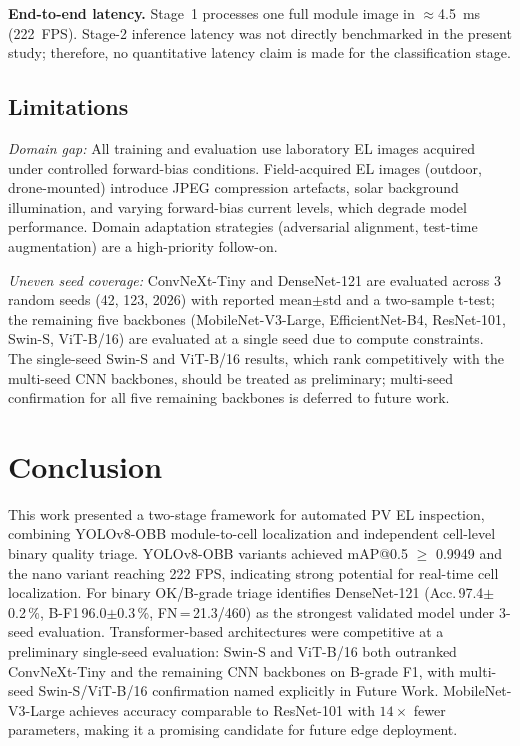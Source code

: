 \documentclass[conference]{IEEEtran}
\begin{document}
\textbf{End-to-end latency.} Stage~1 processes one full module image in $\approx$4.5~ms (222~FPS). Stage-2 inference latency was not directly benchmarked in the present study; therefore, no quantitative latency claim is made for the classification stage.

\subsection{Limitations}

\textit{Domain gap:} All training and evaluation use laboratory EL images acquired under controlled forward-bias conditions. Field-acquired EL images (outdoor, drone-mounted) introduce JPEG compression artefacts, solar background illumination, and varying forward-bias current levels, which degrade model performance. Domain adaptation strategies (adversarial alignment, test-time augmentation) are a high-priority follow-on.

\textit{Uneven seed coverage:} ConvNeXt-Tiny and DenseNet-121 are evaluated across 3 random seeds (42, 123, 2026) with reported mean$\pm$std and a two-sample t-test; the remaining five backbones (MobileNet-V3-Large, EfficientNet-B4, ResNet-101, Swin-S, ViT-B/16) are evaluated at a single seed due to compute constraints. The single-seed Swin-S and ViT-B/16 results, which rank competitively with the multi-seed CNN backbones, should be treated as preliminary; multi-seed confirmation for all five remaining backbones is deferred to future work.

\section{Conclusion}
\label{sec:conclusion}

This work presented a two-stage framework for automated PV EL inspection, combining YOLOv8-OBB module-to-cell localization and independent cell-level binary quality triage. YOLOv8-OBB variants achieved mAP@0.5 $\geq$ 0.9949 and the nano variant reaching 222 FPS, indicating strong potential for real-time cell localization. For binary OK/B-grade triage identifies DenseNet-121 (Acc.\,97.4$\pm$0.2\,\%, B-F1\,96.0$\pm$0.3\,\%, FN\,=\,21.3/460) as the strongest validated model under 3-seed evaluation. Transformer-based architectures were competitive at a preliminary single-seed evaluation: Swin-S and ViT-B/16 both outranked ConvNeXt-Tiny and the remaining CNN backbones on B-grade F1, with multi-seed Swin-S/ViT-B/16 confirmation named explicitly in Future Work. MobileNet-V3-Large achieves accuracy comparable to ResNet-101 with $14\times$ fewer parameters, making it a promising candidate for future edge deployment.
\end{document}
